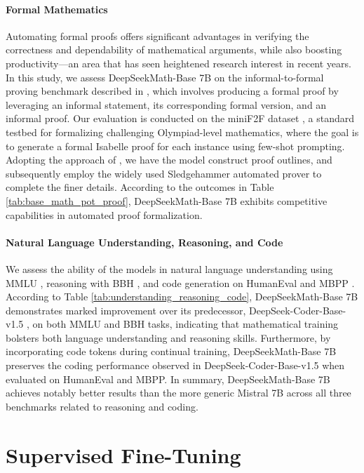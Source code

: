 \begin{itemize}[topsep=0pt]
\paragraph{Formal Mathematics}

Automating formal proofs offers significant advantages in verifying the correctness and dependability of mathematical arguments, while also boosting productivity—an area that has seen heightened research interest in recent years. In this study, we assess DeepSeekMath-Base 7B on the informal-to-formal proving benchmark described in \citep{dsp_proof}, which involves producing a formal proof by leveraging an informal statement, its corresponding formal version, and an informal proof. Our evaluation is conducted on the miniF2F dataset \citep{minif2f}, a standard testbed for formalizing challenging Olympiad-level mathematics, where the goal is to generate a formal Isabelle proof for each instance using few-shot prompting. Adopting the approach of \cite{dsp_proof}, we have the model construct proof outlines, and subsequently employ the widely used Sledgehammer automated prover \citep{sledgehammer} to complete the finer details. According to the outcomes in Table \ref{tab:base_math_pot_proof}, DeepSeekMath-Base 7B exhibits competitive capabilities in automated proof formalization.

\paragraph{Natural Language Understanding, Reasoning, and Code}

We assess the ability of the models in natural language understanding using MMLU \citep{mmlu}, reasoning with BBH \citep{bbh}, and code generation on HumanEval \citep{codex} and MBPP \citep{mbpp}. According to Table \ref{tab:understanding_reasoning_code}, DeepSeekMath-Base 7B demonstrates marked improvement over its predecessor, DeepSeek-Coder-Base-v1.5 \citep{deepseek-coder}, on both MMLU and BBH tasks, indicating that mathematical training bolsters both language understanding and reasoning skills. Furthermore, by incorporating code tokens during continual training, DeepSeekMath-Base 7B preserves the coding performance observed in DeepSeek-Coder-Base-v1.5 when evaluated on HumanEval and MBPP. In summary, DeepSeekMath-Base 7B achieves notably better results than the more generic Mistral 7B \citep{mistral} across all three benchmarks related to reasoning and coding.

\section{Supervised Fine-Tuning}


\end{itemize}
